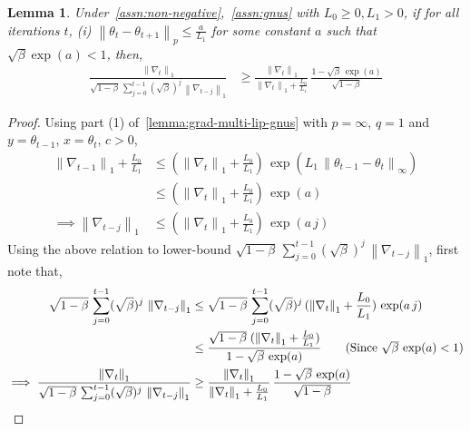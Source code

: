 \documentclass{article}
\newtheorem{lemma}{Lemma}
\newcommand{\norm}[1]{\left\|#1 \right\|}
\newcommand{\tht}{\theta_t}
\newcommand{\thtt}{\theta_{t+1}}
\begin{document}
\begin{lemma}
Under~\cref{assn:non-negative},~\cref{assn:gnus} with $L_0 \geq 0, L_1 > 0$, if for all iterations $t$, 
(i) $\norm{\tht - \thtt}_p \leq \frac{a}{L_1}$ for some constant $a$ such that $\sqrt{\beta} \exp(a) < 1$, then, 
\begin{align*}
\frac{\norm{\nabla_t}_1}{\sqrt{1 - \beta} \, \sum_{j = 0}^{t-1} (\sqrt{\beta})^{j} \, \norm{\nabla_{t-j}}_1} & \geq \frac{\norm{\nabla_t}_1}{\norm{\nabla_t}_1 + \frac{L_0}{L_1}} \, \frac{1 - \sqrt{\beta} \, \exp(a)}{\sqrt{1 - \beta}}     
\end{align*}

\label{lemma:rms-ratio-2pl-gnus}
\end{lemma}
\begin{proof}
Using part (1) of~\cref{lemma:grad-multi-lip-gnus} with $p = \infty$, $q = 1$ and $y = \theta_{t-1}$, $x = \tht$, $c > 0$, 
\begin{align*}
\norm{\nabla_{t-1}}_1 + \frac{L_0}{L_1} & \leq (\norm{\nabla_{t}}_1 + \frac{L_0}{L_1}) \, \exp\left(L_1 \,  \norm{\theta_{t-1} - \tht}_\infty \right) \\
& \leq (\norm{\nabla_{t}}_1 + \frac{L_0}{L_1}) \, \exp(a) \tag{Using assumption (i)} \\
\implies \norm{\nabla_{t-j}}_1 & \leq (\norm{\nabla_{t}}_1 + \frac{L_0}{L_1}) \, \exp(a \, j) \tag{Recursing and since $L_0/L_1 > 0$}
\end{align*}
Using the above relation to lower-bound $\sqrt{1 - \beta} \, \sum_{j = 0}^{t-1} (\sqrt{\beta})^{j} \, \norm{\nabla_{t-j}}_1$, first note that, 
\begin{align*}
\sqrt{1 - \beta} \, \sum_{j = 0}^{t-1} (\sqrt{\beta})^{j} \, \norm{\nabla_{t-j}}_1 & \leq \sqrt{1 - \beta} \, \sum_{j = 0}^{t-1} (\sqrt{\beta})^j \, (\norm{\nabla_{t}}_1 + \frac{L_0}{L_1}) \, \exp(a \, j) \\
& \leq \frac{\sqrt{1 - \beta} \; (\norm{\nabla_{t}}_1 + \frac{L_0}{L_1})}{1 - \sqrt{\beta} \, \exp(a)} \tag{Since $\sqrt{\beta} \, \exp(a) < 1$} \\
\implies \frac{\norm{\nabla_t}_1}{\sqrt{1 - \beta} \, \sum_{j = 0}^{t-1} (\sqrt{\beta})^{j} \, \norm{\nabla_{t-j}}_1} & \geq \frac{\norm{\nabla_t}_1}{\norm{\nabla_t}_1 + \frac{L_0}{L_1}} \, \frac{1 - \sqrt{\beta} \, \exp(a)}{\sqrt{1 - \beta}} 
\end{align*}

\end{proof}
\end{document}
